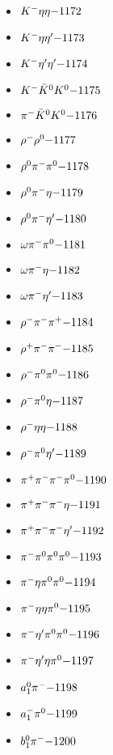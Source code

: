\begin{multicols}{3}
\begin{itemize}
 \item $ K^{-} \eta \eta \hfill{-1172}$
 \item $ K^{-} \eta {\eta^{\prime}} \hfill{-1173}$
 \item $ K^{-} {\eta^{\prime}} {\eta^{\prime}} \hfill{-1174}$
 \item $ K^{-} \bar{K}^{0} K^{0} \hfill{-1175}$
 \item $ \pi^{-} \bar{K}^{0} K^{0} \hfill{-1176}$
 \item $ \rho^{-} \rho^{0} \hfill{-1177}$
 \item $ \rho^{0} \pi^{-} \pi^{0} \hfill{-1178}$
 \item $ \rho^{0} \pi^{-} \eta \hfill{-1179}$
 \item $ \rho^{0} \pi^{-} {\eta^{\prime}} \hfill{-1180}$
 \item $ \omega \pi^{-} \pi^{0} \hfill{-1181}$
 \item $ \omega \pi^{-} \eta \hfill{-1182}$
 \item $ \omega \pi^{-} {\eta^{\prime}} \hfill{-1183}$
 \item $ \rho^{-} \pi^{-} \pi^{+} \hfill{-1184}$
 \item $ \rho^{+} \pi^{-} \pi^{-} \hfill{-1185}$
 \item $ \rho^{-} \pi^{0} \pi^{0} \hfill{-1186}$
 \item $ \rho^{-} \pi^{0} \eta \hfill{-1187}$
 \item $ \rho^{-} \eta \eta \hfill{-1188}$
 \item $ \rho^{-} \pi^{0} {\eta^{\prime}} \hfill{-1189}$
 \item $ \pi^{+} \pi^{-} \pi^{-} \pi^{0} \hfill{-1190}$
 \item $ \pi^{+} \pi^{-} \pi^{-} \eta \hfill{-1191}$
 \item $ \pi^{+} \pi^{-} \pi^{-} {\eta^{\prime}} \hfill{-1192}$
 \item $ \pi^{-} \pi^{0} \pi^{0} \pi^{0} \hfill{-1193}$
 \item $ \pi^{-} \eta \pi^{0} \pi^{0} \hfill{-1194}$
 \item $ \pi^{-} \eta \eta \pi^{0} \hfill{-1195}$
 \item $ \pi^{-} {\eta^{\prime}} \pi^{0} \pi^{0} \hfill{-1196}$
 \item $ \pi^{-} {\eta^{\prime}} \eta \pi^{0} \hfill{-1197}$
 \item $ a_{1}^{0} \pi^{-} \hfill{-1198}$
 \item $ a_{1}^{-} \pi^{0} \hfill{-1199}$
 \item $ b_{1}^{0} \pi^{-} \hfill{-1200}$

\end{itemize}
\end{multicols}
